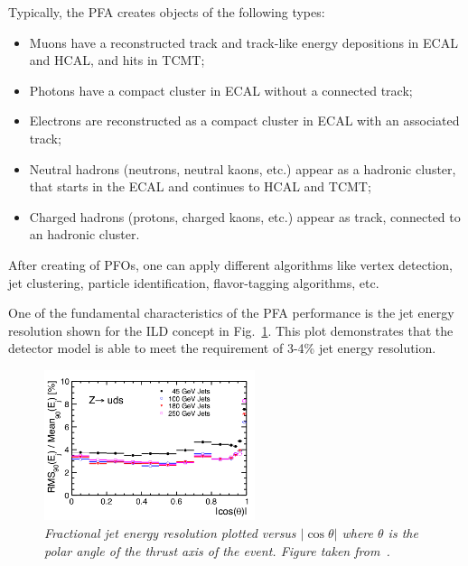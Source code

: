 Typically, the PFA creates objects of the following types:
\begin{itemize}
\item Muons have a reconstructed track and track-like energy depositions in ECAL and HCAL, and hits in TCMT;
\item Photons have a compact cluster in ECAL without a connected track;
\item Electrons are reconstructed as a compact cluster in ECAL with an associated track;

\item Neutral hadrons (neutrons, neutral kaons, etc.) appear as a hadronic cluster, that starts in the ECAL and continues to HCAL and TCMT;
\item Charged hadrons (protons, charged kaons, etc.) appear as track, connected to an hadronic cluster.
\end{itemize}

After creating of PFOs, one can apply different algorithms like vertex detection, jet clustering, particle identification, flavor-tagging algorithms, etc.

One of the fundamental characteristics of the PFA performance is the jet energy resolution shown for the ILD concept in Fig.~\ref{fig:ILCjetrms}. This plot demonstrates that the detector model is able to meet the requirement of 3-4\% jet energy resolution.

\begin{figure}[H]
{\centering
    \includegraphics[width=0.55\textwidth]{graphics/ILCjetrms.png}
    \caption{\sl Fractional jet energy resolution plotted versus $|\cos\theta|$ where $\theta$ is the polar angle of the thrust axis of the event. Figure taken from~\cite{bib:ILC}.}
    \label{fig:ILCjetrms}
  }
\end{figure}




